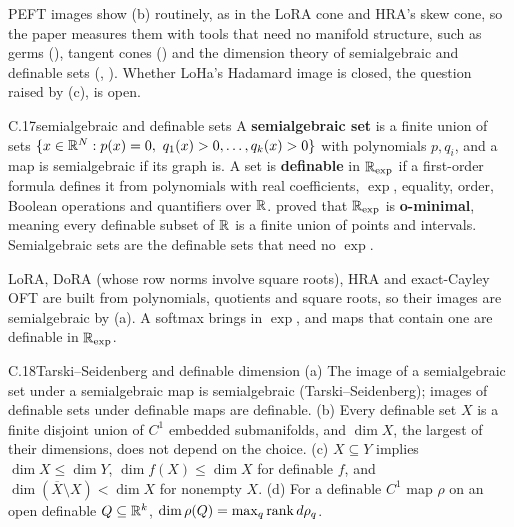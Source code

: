 PEFT images show (b) routinely, as in the LoRA cone and HRA's skew cone, so the paper measures them with tools that need
no manifold structure, such as germs (), tangent cones () and the dimension theory of
semialgebraic and definable sets (, ). Whether LoHa's Hadamard image is closed, the question
raised by (c), is open.


\begin{bgentry}{C.17}{semialgebraic and definable sets}
A \textbf{semialgebraic set} is a finite union of sets $\{x\in\R^N:p(x)=0,\ q_1(x)>0,\dots,q_k(x)>0\}$ with polynomials
$p,q_i$, and a map is semialgebraic if its graph is. A set is \textbf{definable} in $\mathbb{R}_{\exp}$ if a first-order formula
defines it from polynomials with real coefficients, $\exp$, equality, order, Boolean operations and quantifiers over
$\mathbb{R}$. \citet{xwilkie1996model} proved that $\mathbb{R}_{\exp}$ is \textbf{o-minimal}, meaning every definable subset of $\mathbb{R}$ is
a finite union of points and intervals. Semialgebraic sets are the definable sets that need no $\exp$.
\end{bgentry}

LoRA, DoRA (whose row norms involve square roots), HRA and exact-Cayley OFT \citep{qiu2023controlling} are built from
polynomials, quotients and square roots, so their images are semialgebraic by (a). A softmax brings in
$\exp$, and maps that contain one are definable in $\mathbb{R}_{\exp}$.


\begin{bgfact}{C.18}{Tarski--Seidenberg and definable dimension}
(a) The image of a semialgebraic set under a semialgebraic map is semialgebraic (Tarski--Seidenberg); images of
definable sets under definable maps are definable. (b) Every definable set $X$ is a finite disjoint union of $C^1$
embedded submanifolds, and $\dim X$, the largest of their dimensions, does not depend on the choice. (c) $X\subseteq Y$
implies $\dim X\le\dim Y$, $\dim f(X)\le\dim X$ for definable $f$, and $\dim(\overline X\setminus X)<\dim X$ for
nonempty $X$. (d) For a definable $C^1$ map $\rho$ on an open definable $Q\subseteq\mathbb{R}^k$, $\dim\rho(Q)=\max_q\operatorname{rank}
d\rho_q$.
\end{bgfact}

